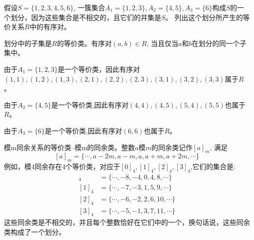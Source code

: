 \begin{example}
	假设$S=\{1,2,3,4,5,6\}$, 一簇集合$A_1=\{1,2,3\},A_2=\{4,5\},A_3=\{6\}$构成$S$的一个划分，因为这些集合是不相交的，且它们的并集是$S$。
	列出这个划分所产生的等价关系$R$中的有序对。
\end{example}

\begin{solution}
	划分中的子集是$R$的等价类。有序对$(a,b)\in R$, 当且仅当$a$和$b$在划分的同一个子集中。
	
	由于$A_1=\{1,2,3\}$是一个等价类，因此有序对$(1,1),(1,2),(1,3),(2,1),(2,2),(2,3),(3,1),(3,2),(3,3)$属于$R$。
	
	由于$A_2=\{4,5\}$是一个等价类,因此有序对$(4,4),(4,5),(5,4),(5,5)$也属于$R$。
	
	由于$A_3=\{6\}$是一个等价类,因此有序对$(6,6)$也属于$R$。
\end{solution}

\begin{example}
    模m同余关系的等价类--模m的同余类。整数$a$模$m$的同余类记作$[a]_m$, 满足
	\[ [a]_m=\{\cdots,a-2m,a-m,a,a+m,a+2m,\cdots \}\] 
	例如，模4同余存在4个等价类，对应于$[0]_4,[1]_4,[2]_4,[3]_4$,它们的集合是:
	\begin{align*}
	[0]_4 &=\{\cdots,-8,-4,0,4,8,\cdots \} \\
	[1]_4 &=\{\cdots,-7,-3,1,5,9,\cdots \} \\
	[2]_4 &=\{\cdots,-6,-2,2,6,10,\cdots \} \\
	[3]_4 &=\{\cdots,-5,-1,3,7,11,\cdots \} 
	\end{align*}
	这些同余类是不相交的，并且每个整数恰好在它们中的一个，换句话说，这些同余类构成了一个划分。
\end{example}

